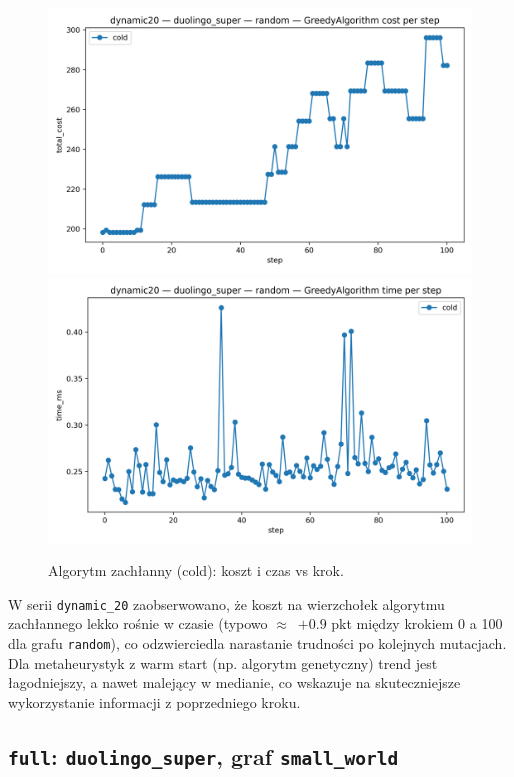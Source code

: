 \begin{figure}[H]
  \centering
  \includegraphics[width=0.48\linewidth]{assets/figures/dynamic/dynamic20/duolingo_super/random/GreedyAlgorithm_cost_per_step.png}
  \includegraphics[width=0.48\linewidth]{assets/figures/dynamic/dynamic20/duolingo_super/random/GreedyAlgorithm_time_per_step.png}
\caption{Algorytm zachłanny (cold): koszt i czas vs krok.}
  \label{fig:dyn20_duo_greedy}
\end{figure}

W serii \texttt{dynamic\_20} zaobserwowano, że koszt na wierzchołek algorytmu zachłannego lekko rośnie w czasie (typowo $\approx$~$+0.9$ pkt między krokiem 0 a 100 dla grafu \texttt{random}), co odzwierciedla narastanie trudności po kolejnych mutacjach. Dla metaheurystyk z warm start (np. algorytm genetyczny) trend jest łagodniejszy, a nawet malejący w medianie, co wskazuje na skuteczniejsze wykorzystanie informacji z poprzedniego kroku.

\subsection{\texttt{full}: \texttt{duolingo\_super}, graf \texttt{small\_world}}

